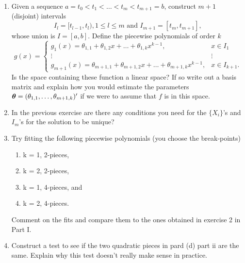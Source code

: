 \documentclass[12pt]{article}
\begin{document}
\begin{enumerate}
\begin{enumerate}
\item Given a sequence $a = t_0 < t_1 < \dots < t_m < t_{m+1} = b$,
  construct $m+1$ (disjoint) intervals
\[
I_l = [t_{l-1},t_l), 1 \leq l \leq m \mbox{ and } I_{m+1} =
[t_m,t_{m+1}],
\]
whose union is $I=[a,b]$. Define the piecewise polynomials of order
$k$  
\[
g(x) = \left\{   \begin{array}{cc}
    g_1(x) = \theta_{1,1} + \theta_{1,2} x + \dots + \theta_{1,k}
    x^{k-1},&x \in I_1\\
    \vdots&\vdots\\
    g_{m+1}(x) = \theta_{m+1,1} + \theta_{m+1,2} x + \dots + \theta_{m+1,k}
    x^{k-1},&x \in I_{k+1}.
\end{array}
\right.
\]
Is the space containing these function a linear space? If so write out
a basis matrix and explain how you would estimate the parameters
$\mbox{\boldmath $\theta$\unboldmath}=(\theta_{1,1},\dots,\theta_{m+1,k})'$ if we were to
assume that $f$ is in this space.

\item In the previous exercise are there any conditions you need for the
  $\{X_i\}$'s and $I_m$'s for the solution to be unique?

\item 
Try fitting the following piecewise polynomials (you choose the
  break-points)
\begin{enumerate}
\item k = 1, 2-pieces,
\item k = 2, 2-pieces,
\item k = 1, 4-pieces, and 
\item k = 2, 4-pieces. 
\end{enumerate}
Comment on the fits and compare them to the ones obtained in
exercise 2 in Part I.

\item Construct a test to see if the two quadratic
  pieces in pard (d) part ii are the same. Explain why this test doesn't really make 
  sense in practice.

\end{enumerate}


\end{enumerate}
\end{document}
